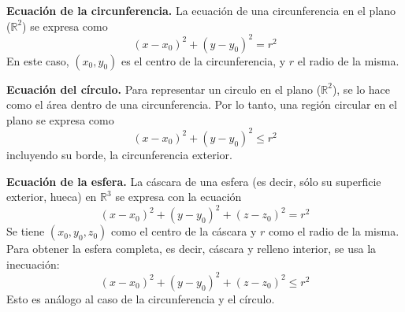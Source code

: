 \begin{definition}\textbf{Ecuación de la circunferencia.}
    La ecuación de una circunferencia en el plano ($\mathbb{R}^2$)
    se expresa como 
    \begin{equation*}
        (x-x_0)^2+(y-y_0)^2=r^2
    \end{equation*} 
    En este caso, $(x_0,y_0)$ es el centro
    de la circunferencia, y $r$ el radio de la misma.
\end{definition}
\begin{definition}\textbf{Ecuación del círculo.}
    Para representar un circulo en el plano ($\mathbb{R}^2$), se lo hace como el
    área dentro de una circunferencia. Por lo tanto, una región circular en el plano se expresa
    como
    \begin{equation*}
        (x-x_0)^2+(y-y_0)^2\leq r^2
    \end{equation*} 
    incluyendo su borde, la circunferencia exterior.
\end{definition}
\begin{definition}\textbf{Ecuación de la esfera.}
    La cáscara de una esfera (es decir, sólo su superficie exterior, hueca) 
    en $\mathbb{R}^3$ se expresa con la ecuación
    \begin{equation*}
        (x-x_0)^2+(y-y_0)^2+(z-z_0)^2=r^2
    \end{equation*}
    Se tiene $(x_0,y_0,z_0)$ como el centro de la cáscara y $r$ como el radio de la misma.
    Para obtener la esfera completa, es decir, cáscara y relleno interior, se usa la inecuación:
    \begin{equation*}
        (x-x_0)^2+(y-y_0)^2+(z-z_0)^2\leq r^2
    \end{equation*}
    Esto es análogo al caso de la circunferencia y el círculo.
\end{definition}
